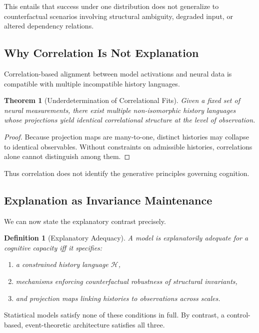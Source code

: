 \documentclass[11pt]{article}
\newtheorem{definition}{Definition}
\newtheorem{theorem}{Theorem}
\begin{document}
This entails that success under one distribution does not generalize to counterfactual scenarios involving structural ambiguity, degraded input, or altered dependency relations.

\subsection{Why Correlation Is Not Explanation}

Correlation-based alignment between model activations and neural data is compatible with multiple incompatible history languages.

\begin{theorem}[Underdetermination of Correlational Fits]
Given a fixed set of neural measurements, there exist multiple non-isomorphic history languages whose projections yield identical correlational structure at the level of observation.
\end{theorem}

\begin{proof}
Because projection maps are many-to-one, distinct histories may collapse to identical observables. Without constraints on admissible histories, correlations alone cannot distinguish among them.
\end{proof}

Thus correlation does not identify the generative principles governing cognition.

\subsection{Explanation as Invariance Maintenance}

We can now state the explanatory contrast precisely.

\begin{definition}[Explanatory Adequacy]
A model is explanatorily adequate for a cognitive capacity iff it specifies:
\begin{enumerate}
  \item a constrained history language $\mathcal{H}$,
  \item mechanisms enforcing counterfactual robustness of structural invariants,
  \item and projection maps linking histories to observations across scales.
\end{enumerate}
\end{definition}

Statistical models satisfy none of these conditions in full. By contrast, a control-based, event-theoretic architecture satisfies all three.
\end{document}
